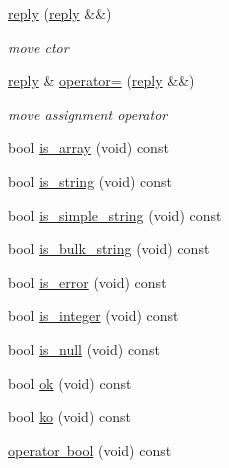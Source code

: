 \begin{DoxyCompactItemize}
\mbox{\label{classcpp__redis_1_1reply_ab6e72fd6750b1ca361563cb963a2dabf}} 
\mbox{\hyperlink{classcpp__redis_1_1reply_ab6e72fd6750b1ca361563cb963a2dabf}{reply}} (\mbox{\hyperlink{classcpp__redis_1_1reply}{reply}} \&\&)
\begin{DoxyCompactList}\small\item\em move ctor \end{DoxyCompactList}\item 
\mbox{\label{classcpp__redis_1_1reply_ab409a28600e9f8d8813acef3c56192ea}} 
\mbox{\hyperlink{classcpp__redis_1_1reply}{reply}} \& \mbox{\hyperlink{classcpp__redis_1_1reply_ab409a28600e9f8d8813acef3c56192ea}{operator=}} (\mbox{\hyperlink{classcpp__redis_1_1reply}{reply}} \&\&)
\begin{DoxyCompactList}\small\item\em move assignment operator \end{DoxyCompactList}\item 
bool \mbox{\hyperlink{classcpp__redis_1_1reply_a3a94881a46125d281cb36191c4b7d19a}{is\+\_\+array}} (void) const
\item 
bool \mbox{\hyperlink{classcpp__redis_1_1reply_a7072729490fdbad26ddeb02df8002147}{is\+\_\+string}} (void) const
\item 
bool \mbox{\hyperlink{classcpp__redis_1_1reply_aeb92f6f84d226239e9800893ab6062ca}{is\+\_\+simple\+\_\+string}} (void) const
\item 
bool \mbox{\hyperlink{classcpp__redis_1_1reply_ab1f4e57a33fb438ab165a65f2d31ca8d}{is\+\_\+bulk\+\_\+string}} (void) const
\item 
bool \mbox{\hyperlink{classcpp__redis_1_1reply_af61ba1b5a0617c0036fb69e7ad5ee159}{is\+\_\+error}} (void) const
\item 
bool \mbox{\hyperlink{classcpp__redis_1_1reply_a75216234d6aafd8f81025b22bdbb4440}{is\+\_\+integer}} (void) const
\item 
bool \mbox{\hyperlink{classcpp__redis_1_1reply_ac9a967c09aad1cdc7ec3459a330ab274}{is\+\_\+null}} (void) const
\item 
bool \mbox{\hyperlink{classcpp__redis_1_1reply_a1270c4197e0ce79df996565f44011ac0}{ok}} (void) const
\item 
bool \mbox{\hyperlink{classcpp__redis_1_1reply_a17e261cc8e7686bb2126d7df9223611a}{ko}} (void) const
\item 
\mbox{\hyperlink{classcpp__redis_1_1reply_a74ef4651c068bfc68436f7e3c7a9a2e6}{operator bool}} (void) const

\end{DoxyCompactItemize}
